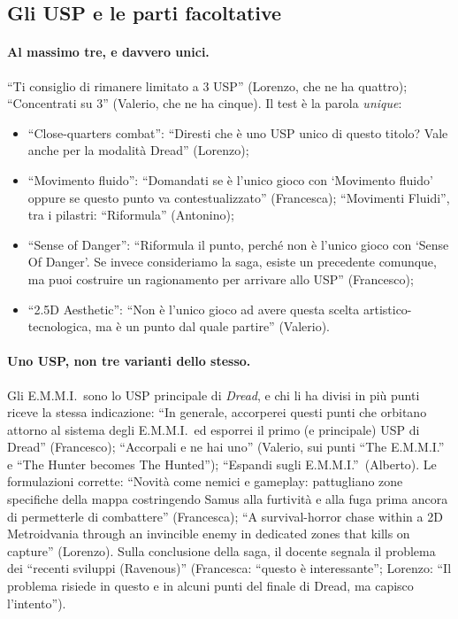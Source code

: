 \subsection{Gli USP e le parti facoltative}
\label{rv:t5:sec:usp}

\paragraph{Al massimo tre, e davvero unici.} ``Ti consiglio di rimanere
limitato a 3 USP'' (Lorenzo, che ne ha quattro); ``Concentrati su 3''
(Valerio, che ne ha cinque). Il test è la parola \emph{unique}:
\begin{itemize}
  \item ``Close-quarters combat'': ``Diresti che è uno USP unico di questo
        titolo? Vale anche per la modalità Dread'' (Lorenzo);
  \item ``Movimento fluido'': ``Domandati se è l'unico gioco con `Movimento
        fluido' oppure se questo punto va contestualizzato'' (Francesca);
        ``Movimenti Fluidi'', tra i pilastri: ``Riformula'' (Antonino);
  \item ``Sense of Danger'': ``Riformula il punto, perché non è l'unico gioco
        con `Sense Of Danger'. Se invece consideriamo la saga, esiste un
        precedente comunque, ma puoi costruire un ragionamento per arrivare
        allo USP'' (Francesco);
  \item ``2.5D Aesthetic'': ``Non è l'unico gioco ad avere questa scelta
        artistico-tecnologica, ma è un punto dal quale partire'' (Valerio).
\end{itemize}

\paragraph{Uno USP, non tre varianti dello stesso.} Gli E.M.M.I.\ sono lo USP
principale di \emph{Dread}, e chi li ha divisi in più punti riceve la stessa
indicazione: ``In generale, accorperei questi punti che orbitano attorno al
sistema degli E.M.M.I.\ ed esporrei il primo (e principale) USP di Dread''
(Francesco); ``Accorpali e ne hai uno'' (Valerio, sui punti ``The E.M.M.I.''
e ``The Hunter becomes The Hunted''); ``Espandi sugli E.M.M.I.''\ (Alberto).
Le formulazioni corrette: ``Novità come nemici e gameplay: pattugliano zone
specifiche della mappa costringendo Samus alla furtività e alla fuga prima
ancora di permetterle di combattere'' (Francesca); ``A survival-horror chase
within a 2D Metroidvania through an invincible enemy in dedicated zones that
kills on capture'' (Lorenzo). Sulla conclusione della saga, il docente
segnala il problema dei ``recenti sviluppi (Ravenous)'' (Francesca:
``questo è interessante''; Lorenzo: ``Il problema risiede in questo e in
alcuni punti del finale di Dread, ma capisco l'intento'').

